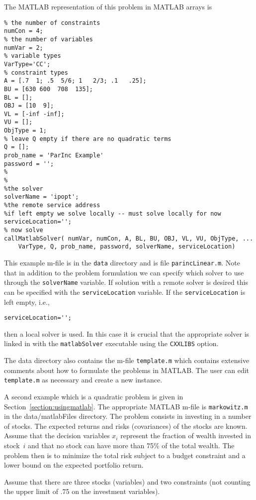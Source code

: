 The MATLAB representation of this problem in MATLAB arrays is
\begin{verbatim}
% the number of constraints
numCon = 4;
% the number of variables
numVar = 2;
% variable types
VarType='CC';
% constraint types
A = [.7  1; .5  5/6; 1   2/3; .1   .25];
BU = [630 600  708  135];
BL = [];
OBJ = [10  9];
VL = [-inf -inf];
VU = [];
ObjType = 1;
% leave Q empty if there are no quadratic terms
Q = [];
prob_name = 'ParInc Example'
password = '';
%
%
%the solver
solverName = 'ipopt';
%the remote service address
%if left empty we solve locally -- must solve locally for now
serviceLocation='';
% now solve
callMatlabSolver( numVar, numCon, A, BL, BU, OBJ, VL, VU, ObjType, ...
    VarType, Q, prob_name, password, solverName, serviceLocation)
\end{verbatim}
This example m-file is in the {\tt data} directory and is file {\tt parincLinear.m}. Note that in addition to the problem formulation
we can specify which solver to use through the {\tt solverName} variable.  If solution with a remote solver is desired
this can be specified with the {\tt serviceLocation} variable.  If the {\tt serviceLocation} is left empty, i.e.,
\begin{verbatim}
serviceLocation='';
\end{verbatim}
then a local solver is used. In this case  it is crucial that the appropriate solver is linked in with the {\tt matlabSolver}
executable using the {\tt CXXLIBS} option.


The data directory  also contains the m-file  {\tt template.m} which contains extensive comments about how to formulate
the problems in MATLAB.   The user can edit {\tt template.m} as necessary and create a new instance.




 A second example which is a quadratic problem is given in Section~\ref{section:usingmatlab}.
The appropriate MATLAB m-file is {\tt markowitz.m} in the {data/matlabFiles} directory.
The problem consists in investing  in a number of stocks. The expected returns and risks
(covariances) of the stocks are known. Assume that the decision variables $x_i$
represent the fraction of wealth invested in stock~$i$ and that no stock can have
more than 75\% of the total wealth. The problem then is to minimize the total risk
subject to a budget constraint and a lower bound on the expected portfolio return.

Assume that there are three stocks (variables) and two constraints (not counting the upper limit  %
of .75 on the investment variables).


